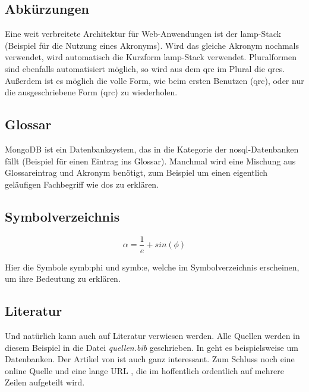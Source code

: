 \subsection{Abkürzungen}

Eine weit verbreitete Architektur für Web-Anwendungen ist der \gls{lamp}-Stack (Beispiel für die Nutzung eines Akronyms).
Wird das gleiche Akronym nochmals verwendet, wird automatisch die Kurzform \gls{lamp}-Stack verwendet.
Pluralformen sind ebenfalls automatisiert möglich, so wird aus dem \gls{qrc} im Plural die \glspl{qrc}.
Außerdem ist es möglich die volle Form, wie beim ersten Benutzen (\acrfull{qrc}), oder nur die ausgeschriebene Form (\acrlong{qrc}) zu wiederholen.

\subsection{Glossar}

MongoDB ist ein Datenbanksystem, das in die Kategorie der \gls{nosql}-Datenbanken fällt (Beispiel für einen Eintrag ins Glossar).
Manchmal wird eine Mischung aus Glossareintrag und Akronym benötigt, zum Beispiel um einen eigentlich geläufigen Fachbegriff wie \gls{dos} zu erklären.

\subsection{Symbolverzeichnis}

\begin{equation}
  \alpha = \frac{1}{e} + sin(\phi)
\end{equation}

Hier die Symbole \gls{symb:phi} und \gls{symb:e}, welche im Symbolverzeichnis erscheinen, um ihre Bedeutung zu erklären.

\subsection{Literatur}

Und natürlich kann auch auf Literatur verwiesen werden.
Alle Quellen werden in diesem Beispiel in die Datei \textit{quellen.bib} geschrieben.
In  \cite{unterstein12} geht es beispielsweise um Datenbanken.
Der Artikel von \citeauthor{goldberg91} \cite{goldberg91} ist auch ganz interessant.
Zum Schluss noch eine online Quelle \cite{wave} und eine lange URL \cite{long}, die im  hoffentlich ordentlich auf mehrere Zeilen aufgeteilt wird.


